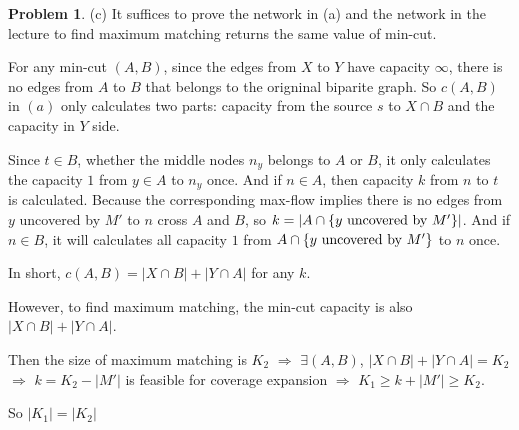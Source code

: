 \documentclass[a4paper]{article}
\theoremstyle{definition}
\newtheorem{problem}{Problem}
\theoremstyle{plain}
\numberwithin{equation}{problem}
\newcommand{\ie}{ \textit{ i.e. } }
\begin{document}
\begin{problem}
    (c)
    It suffices to prove the network in (a) and the network in the lecture to find maximum matching returns the same value of min-cut.

    For any min-cut  $ (A,B)  $, since the edges from  $ X  $ to  $ Y  $ have capacity  $ \infty $, there is no edges from  $ A $ to  $ B  $ that belongs to the origninal biparite graph. So  $ c(A,B) $ in  $ (a) $ only calculates two parts: capacity from the source  $ s $ to  $ X\cap B $  and the capacity in  $ Y  $ side.
    
    Since  $ t\in B $, whether the middle nodes  $ n_y $ belongs to 
     $ A $ or  $ B $, it only calculates the capacity $ 1 $  from  $ y\in A  $ to  $ n_y $ once.
    And if  $ n\in A $, then capacity $ k $ from  $ n  $ to  $ t $ is calculated. Because the corresponding max-flow implies there is no edges from  $ y $ uncovered by  $ M' $ to  $ n $ cross  $ A $ and  $ B $, so  $ k=|A\cap\{y\text{ uncovered by  $ M' $}\}| $.     And if  $ n\in B $, it will calculates all capacity  $ 1 $  from  $ A\cap\{y\text{ uncovered by  $ M' $}\} $ to  $ n $ once.

    In short,  $ c(A,B)=|X\cap B|+|Y\cap A| $ for any  $ k $.
    
    However, to find maximum matching, the min-cut capacity is also  $ |X\cap B|+|Y\cap A| $.
    
    Then the size of maximum matching is $ K_2 $  $ \Rightarrow  $ $ \exists (A,B) $,  $ |X\cap B|+|Y\cap A|=K_2 $ $ \Rightarrow  $  $ k=K_2-|M'| $ is feasible for coverage expansion  $ \Rightarrow  $  $ K_1 \geq k+|M'| \geq K_2 $. 
    
    So  $ |K_1|=|K_2| $ 
    
    
    
    

    

\end{problem}
\end{document}

